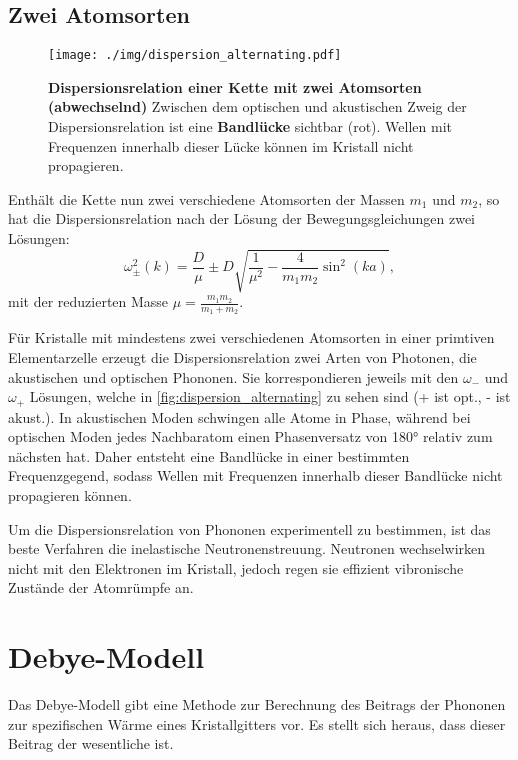 \subsection{Zwei Atomsorten}
\begin{figure}[tbp]
	\centering
	\texttt{[image: ./img/dispersion\_alternating.pdf]}
	\caption{\textbf{Dispersionsrelation einer Kette mit zwei Atomsorten (abwechselnd)} Zwischen dem optischen und akustischen Zweig der Dispersionsrelation ist eine \textbf{Bandlücke} sichtbar (rot). Wellen mit Frequenzen innerhalb dieser Lücke können im Kristall nicht propagieren.}
	\label{fig:dispersion_alternating}
\end{figure}
Enthält die Kette nun zwei verschiedene Atomsorten der Massen $m_1$ und $m_2$, so hat die Dispersionsrelation nach der Lösung der Bewegungsgleichungen zwei Lösungen:
\begin{equation}
	\omega_\pm^2(k) = \frac{D}{\mu} \pm D\sqrt{\frac{1}{\mu^2} - \frac{4}{m_1 m_2}\sin^2\left(k a\right)},
\end{equation}
mit der reduzierten Masse $\mu = \frac{m_1 m_2}{m_1 + m_2}$.

Für Kristalle mit mindestens zwei verschiedenen Atomsorten in einer primtiven Elementarzelle erzeugt die Dispersionsrelation zwei Arten von Photonen, die akustischen und optischen Phononen.
Sie korrespondieren jeweils mit den $\omega_{-}$ und $\omega_{+}$ Lösungen, welche in \autoref{fig:dispersion_alternating} zu sehen sind (+ ist opt., - ist akust.).
In akustischen Moden schwingen alle Atome in Phase, während bei optischen Moden jedes Nachbaratom einen Phasenversatz von 180° relativ zum nächsten hat.
Daher entsteht eine Bandlücke in einer bestimmten Frequenzgegend, sodass Wellen mit Frequenzen innerhalb dieser Bandlücke nicht propagieren können.

Um die Dispersionsrelation von Phononen experimentell zu bestimmen, ist das beste Verfahren die inelastische Neutronenstreuung.
Neutronen wechselwirken nicht mit den Elektronen im Kristall, jedoch regen sie effizient vibronische Zustände der Atomrümpfe an.

\section{Debye-Modell}
Das Debye-Modell gibt eine Methode zur Berechnung des Beitrags der Phononen zur spezifischen Wärme eines Kristallgitters vor.
Es stellt sich heraus, dass dieser Beitrag der wesentliche ist.

